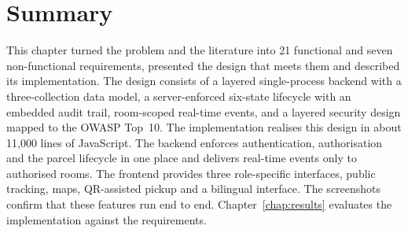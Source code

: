 \section{Summary}

This chapter turned the problem and the literature into 21 functional and seven non-functional requirements, presented the design that meets them and described its implementation. The design consists of a layered single-process backend with a three-collection data model, a server-enforced six-state lifecycle with an embedded audit trail, room-scoped real-time events, and a layered security design mapped to the OWASP Top~10. The implementation realises this design in about 11,000 lines of JavaScript. The backend enforces authentication, authorisation and the parcel lifecycle in one place and delivers real-time events only to authorised rooms. The frontend provides three role-specific interfaces, public tracking, maps, QR-assisted pickup and a bilingual interface. The screenshots confirm that these features run end to end. Chapter~\ref{chap:results} evaluates the implementation against the requirements.
